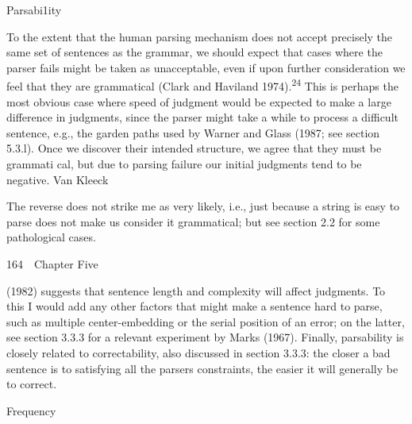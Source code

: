 \begin{styleHeadingviii}
Parsabi1ity
\end{styleHeadingviii}


\begin{styleTextbody}
To the extent that the human parsing mechanism does not accept precisely the same set of sentences as the grammar, we should expect that cases where the parser fails might be taken as unacceptable, even if upon further consideration we feel that they are grammatical (Clark and Haviland 1974).\textsuperscript{24}\textsuperscript{ }This is perhaps the most obvious case where speed of judgment would be expected to make a large difference in judgments, since the parser might take a while to process a difficult sentence, e.g., the garden paths used by Warner and Glass (1987; see section 5.3.l). Once we discover their intended structure, we agree that they must be grammati\- cal, but due to parsing failure our initial judgments tend to be negative. Van Kleeck
\end{styleTextbody}


\setcounter{listWWNumxxxiileveli}{5}
\begin{listWWNumxxxiileveli}
\item 
\begin{styleStandard}
The reverse does not strike me as very likely, i.e., just because a string is easy to parse does not make us consider it grammatical; but see section 2.2 for some pathological cases.
\end{styleStandard}


\end{listWWNumxxxiileveli}
\clearpage\setcounter{page}{1}\begin{styleStandard}
164\ \ Chapter Five
\end{styleStandard}


\begin{styleTextbody}
(1982) suggests that sentence length and complexity will affect judgments. To this I would add any other factors that might make a sentence hard to parse, such as multiple center-embedding or the serial position of an error; on the latter, see section 3.3.3 for a relevant experiment by Marks (1967). Finally, parsability is closely related to correctability, also discussed in section 3.3.3: the closer a bad sentence is to satisfying all the parser{\textquotesingle}s constraints, the easier it will generally be to correct.
\end{styleTextbody}


\begin{styleHeadingviii}
Frequency
\end{styleHeadingviii}


